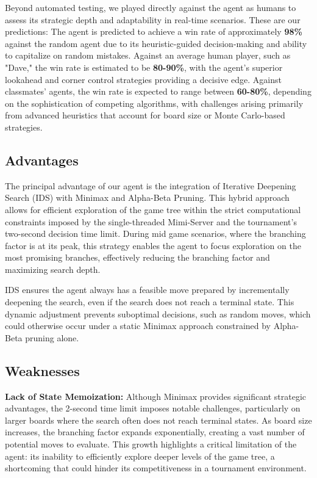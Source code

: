 \documentclass[11pt]{article}
\begin{document}
\noindent Beyond automated testing, we played directly against the agent as humans to assess its strategic depth and adaptability in real-time scenarios.
These are our predictions:
The agent is predicted to achieve a win rate of approximately \textbf{98\%} against the random agent due to its heuristic-guided decision-making and ability to capitalize on random mistakes. Against an average human player, such as "Dave," the win rate is estimated to be \textbf{80-90\%}, with the agent’s superior lookahead and corner control strategies providing a decisive edge. Against classmates' agents, the win rate is expected to range between \textbf{60-80\%}, depending on the sophistication of competing algorithms, with challenges arising primarily from advanced heuristics that account for board size or Monte Carlo-based strategies.


\subsection*{Advantages}
The principal advantage of our agent is the integration of Iterative Deepening Search (IDS) with Minimax and Alpha-Beta Pruning. This hybrid approach allows for efficient exploration of the game tree within the strict computational constraints imposed by the single-threaded Mimi-Server and the tournament’s two-second decision time limit. During mid game scenarios, where the branching factor is at its peak, this strategy enables the agent to focus exploration on the most promising branches, effectively reducing the branching factor and maximizing search depth.

IDS ensures the agent always has a feasible move prepared by incrementally deepening the search, even if the search does not reach a terminal state. This dynamic adjustment prevents suboptimal decisions, such as random moves, which could otherwise occur under a static Minimax approach constrained by Alpha-Beta pruning alone.

\subsection*{Weaknesses}
\noindent \textbf{Lack of State Memoization:}  
Although Minimax provides significant strategic advantages, the 2-second time limit imposes notable challenges, particularly on larger boards where the search often does not reach terminal states. As board size increases, the branching factor expands exponentially, creating a vast number of potential moves to evaluate. This growth highlights a critical limitation of the agent: its inability to efficiently explore deeper levels of the game tree, a shortcoming that could hinder its competitiveness in a tournament environment.
\end{document}
